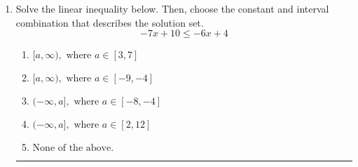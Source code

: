 \documentclass[14pt]{extbook}
\newcommand{\litem}[1]{\item#1\hspace*{-1cm}\rule{\textwidth}{0.4pt}}
\begin{document}
\begin{enumerate}
{\begin{enumerate}[label=\Alph*.]
\end{enumerate} }
\litem{
Solve the linear inequality below. Then, choose the constant and interval combination that describes the solution set.\[ -7x + 10 \leq -6x + 4 \]\begin{enumerate}[label=\Alph*.]
\item \( [a, \infty), \text{ where } a \in [3, 7] \)
\item \( [a, \infty), \text{ where } a \in [-9, -4] \)
\item \( (-\infty, a], \text{ where } a \in [-8, -4] \)
\item \( (-\infty, a], \text{ where } a \in [2, 12] \)
\item \( \text{None of the above}. \)

\end{enumerate} }
\end{enumerate}
\end{document}
